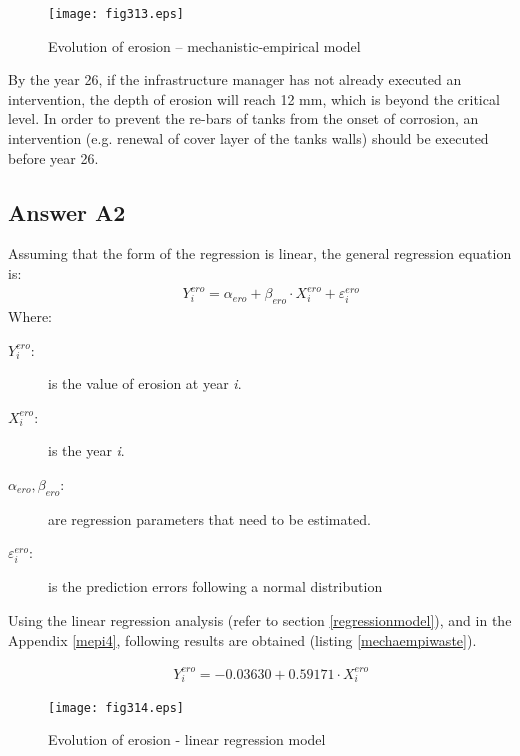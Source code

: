 \begin{figure}[h]
\texttt{[image: fig313.eps]}
\caption{Evolution of erosion – mechanistic-empirical model}
 \label{fig:313}
\end{figure}
%
By the year 26, if the infrastructure manager has not already executed an intervention, the depth of erosion will reach 12 mm, which is beyond the critical level. In order to prevent the re-bars of tanks from the onset of corrosion, an intervention (e.g. renewal of cover layer of the tanks walls) should be executed before year 26. 
\subsection{Answer A2}
Assuming that the form of the regression is linear, the general regression equation is:
\begin{eqnarray}
 && Y_i^{ero} = {\alpha _{ero}} + {\beta _{ero}} \cdot X_i^{ero} + \varepsilon _i^{ero} \label{eq3229}
\end{eqnarray}
Where:
\begin{adjustwidth}{1cm}{}
\begin{description}
\item[$Y_i^{ero}$:] is the value of erosion at year \textit{i}.
\item[$X_i^{ero}$:] is the year \textit{i}.
\item[${\alpha _{ero}},{\beta _{ero}}$:] are regression parameters that need to be estimated.
\item[$\varepsilon _i^{ero}$:] is the prediction errors following a normal distribution
\end{description}
\end{adjustwidth}
Using the linear regression analysis (refer to section \ref{regressionmodel}), and in the Appendix \ref{mepi4}, following results are obtained (listing \ref{mechaempiwaste}).



\begin{eqnarray}
 && Y_i^{ero} =  - 0.03630 + 0.59171 \cdot X_i^{ero} \label{eq3230}
\end{eqnarray}
\begin{figure}[h]
\texttt{[image: fig314.eps]}
\caption{Evolution of erosion - linear regression model}\label{fig:314}
\end{figure}
 
